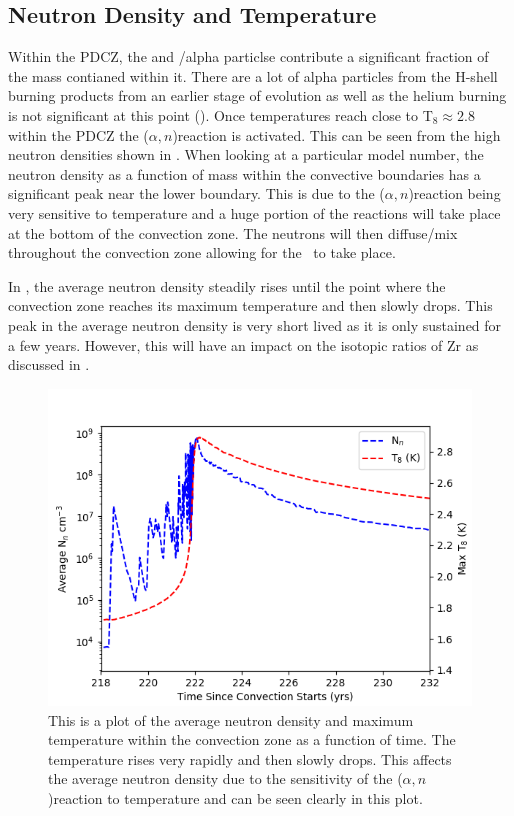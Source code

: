 \documentclass[fleqn,usenatbib]{mnras}
\begin{document}
\subsection{Neutron Density and Temperature}
\label{sec:neutron}

Within the PDCZ, the \neon[22] and \helium[4]/alpha particlse contribute a significant fraction of the mass contianed within it. There are a lot of alpha particles from the H-shell burning products from an earlier stage of evolution as well as the helium burning is not significant at this point (). Once temperatures reach close to T$_{8} \approx 2.8$ within the PDCZ the \neon[22]($\alpha,n$)\magnesium[25] reaction is activated. This can be seen from the high neutron densities shown in . When looking at a particular model number, the neutron density as a function of mass within the convective boundaries has a significant peak near the lower boundary. This is due to the \neon[22]($\alpha,n$)\magnesium[25] reaction being very sensitive to temperature and a huge portion of the reactions will take place at the bottom of the convection zone. The neutrons will then diffuse/mix throughout the convection zone allowing for the \spr~to take place. 

In , the average neutron density steadily rises until the point where the convection zone reaches its maximum temperature and then slowly drops. This peak in the average neutron density is very short lived as it is only sustained for a few years. However, this will have an impact on the isotopic ratios of Zr as discussed in .

\begin{figure}
  \includegraphics[width=\columnwidth]{figs/Neutron_Density_Time.png}
  \caption{This is a plot of the average neutron density and maximum temperature within the convection zone as a function of time. The temperature rises very rapidly and then slowly drops. This affects the average neutron density due to the sensitivity of the \neon[22]($\alpha,n$)\magnesium[25] reaction to temperature and can be seen clearly in this plot.} 
\end{figure}
\end{document}
